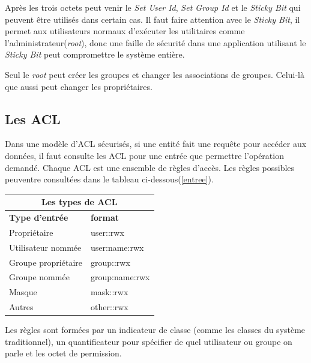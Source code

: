 Après les trois octets peut venir le \emph{Set User Id}, \emph{Set Group Id} et le \emph{Sticky Bit} qui peuvent être utilisés dans certain cas. Il faut faire attention avec le \emph{Sticky Bit}, il permet aux utilisateurs normaux d'exécuter les utilitaires comme l'administrateur(\emph{root}), donc une faille de sécurité dans une application utilisant le \emph{Sticky Bit} peut compromettre le système entière.
 
Seul le \emph{root} peut créer les groupes et changer les associations de groupes. Celui-là que aussi peut changer les propriétaires.
 
\subsection*{Les ACL}
 
Dans une modèle d'ACL sécurisés, si une entité fait une requête pour accéder aux données, il faut consulte les ACL pour une entrée que permettre l'opération demandé. Chaque ACL est une ensemble de règles d'accès. Les règles possibles peuventre consultées dans le tableau ci-dessous(\ref{entree}).
\begin{center}
\begin{tabular}{|l|l|}
  \hline
    \multicolumn{2}{|c|}{Les types de ACL} \\
  \hline
\textbf{Type d'entrée} & \textbf{format} \\
  \hline
Propriétaire & user::rwx \\
Utilisateur nommée & user:name:rwx \\
Groupe propriétaire & group::rwx \\
Groupe nommée & group:name:rwx \\
Masque & mask::rwx \\
Autres & other::rwx \\
  \hline
\end{tabular}
\label{tab:entree}
\end{center}
 
Les règles sont formées par un indicateur de classe (comme les classes du système traditionnel), un quantificateur pour spécifier de quel utilisateur ou groupe on parle et les octet de permission.
 
